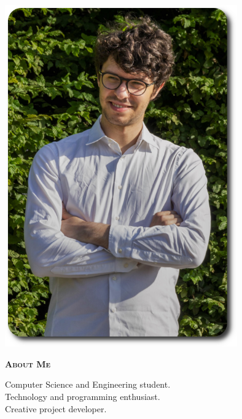\documentclass[11pt, a4paper]{article}
\newcommand{\leftsection}[1]{\vspace*{2ex}\textsc{\textbf{#1}}\par%
\vspace*{-1.5ex}\hrulefill\par\vspace*{0.7ex}}
\begin{document}
\setlength{\topskip}{0pt}
\setlength{\parindent}{0pt}
\setlength{\parskip}{0pt}
\setlength{\fboxsep}{0pt}
\pagestyle{empty}
\raggedbottom

\begin{minipage}[t]{0.30\textwidth} %

  \vspace{-.2ex} %
  \colorbox{cvblue}{
    \color{white}  %
    \textwidth\relax%
    \begin{minipage}[t][293mm][t]{0.82\textwidth}
      \raggedright
      \vspace*{2.5ex}

      \null\hfill\includegraphics[width=0.75\textwidth]{images/photo.png}\hfill\null

      \vspace*{0.5ex} %

      \leftsection{About Me}
      Computer Science and Engineering student. \\
      Technology and programming enthusiast. \\
      Creative project developer. \\


\end{minipage}}
\end{minipage}
\end{document}
